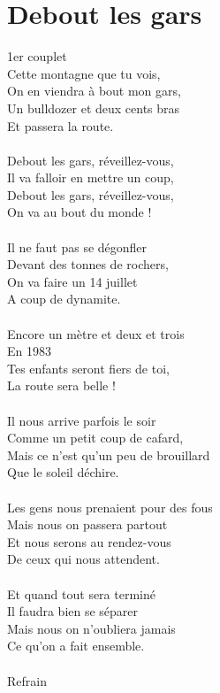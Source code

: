 \section*{Debout les gars}
1er couplet\\
Cette montagne que tu vois,\\
On en viendra à bout mon gars,\\
Un bulldozer et deux cents bras\\
Et passera la route.\\
\\
Debout les gars, réveillez-vous,\\
Il va falloir en mettre un coup,\\
Debout les gars, réveillez-vous,\\
On va au bout du monde !\\
\\
Il ne faut pas se dégonfler\\
Devant des tonnes de rochers,\\
On va faire un 14 juillet\\
A coup de dynamite.\\
\\
Encore un mètre et deux et trois\\
En 1983\\
Tes enfants seront fiers de toi,\\
La route sera belle !\\
\\
Il nous arrive parfois le soir\\
Comme un petit coup de cafard,\\
Mais ce n’est qu’un peu de brouillard\\
Que le soleil déchire.\\
\\
Les gens nous prenaient pour des fous\\
Mais nous on passera partout\\
Et nous serons au rendez-vous\\
De ceux qui nous attendent.\\
\\
Et quand tout sera terminé\\
Il faudra bien se séparer\\
Mais nous on n’oubliera jamais\\
Ce qu’on a fait ensemble.\\
\\
Refrain